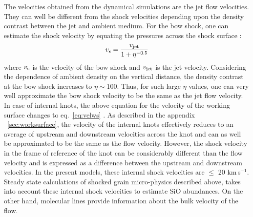 \documentclass[useAMS,usenatbib]{mn2e}
\begin{document}
The velocities obtained from the dynamical simulations are the
jet flow velocities. They can well be different from the shock
velocities depending upon the density contrast between the jet and
ambient medium. For the bow shock, one can estimate the shock velocity 
by equating the pressures across the shock surface \citep[e.g.,][]{Masson:1992p14101}:
\begin{equation}
\label{eq:shockjetvel}
v_{\rm s} = \frac{v_{\rm jet}}{1 + \eta^{-0.5}}
\end{equation}
where $v_{\rm s}$ is the velocity of the bow shock 
and $v_{\rm jet}$ is the jet velocity. 
Considering the dependence of ambient density on the vertical distance, 
the density contrast at the bow shock increases to $\eta \sim 100$. 
Thus, for such large $\eta$ values, one can very well 
approximate the bow shock velocity to be the same as the jet flow velocity.  
In case of internal knots, the above equation for the velocity of the working surface
changes to eq.~\ref{eq:velws} \citep{Raga:1992p16392}. 
As described in the appendix ~\ref{sec:worksurface}, the velocity of the internal 
knots effectively reduces to an average of upstream and downstream 
velocities across the knot and can as well be approximated 
to be the same as the flow velocity. However, the shock velocity 
in the frame of reference of the knot can be considerably different than the flow velocity 
and is expressed as a difference between the upstream and downstream velocities.  
In the present models, these internal shock velocities are $\leq$ 20 km\,s$^{-1}$. 
Steady state calculations of shocked grain 
micro-physics described above, takes into account 
these internal shock velocities to estimate 
SiO abundances. On the other hand, molecular lines provide information
about the bulk velocity of the flow.
%
\end{document}
